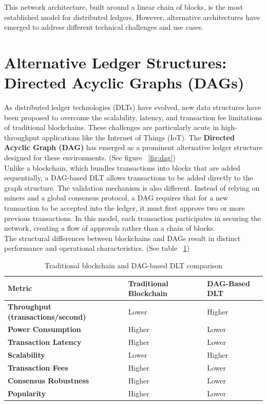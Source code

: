 \documentclass{scrbook}
\begin{document}
This network architecture, built around a linear chain of blocks, is the most established model for distributed ledgers. However, alternative architectures have emerged to address different technical challenges and use cases.\\

\section{Alternative Ledger Structures: Directed Acyclic Graphs (DAGs)}

As distributed ledger technologies (DLTs) have evolved, new data structures have been proposed to overcome the scalability, latency, and transaction fee limitations of traditional blockchains. These challenges are particularly acute in high-throughput applications like the Internet of Things (IoT). The \textbf{Directed Acyclic Graph (DAG)} has emerged as a prominent alternative ledger structure designed for these environments. (See figure ~\ref{fig:dag})\\

Unlike a blockchain, which bundles transactions into blocks that are added sequentially, a DAG-based DLT allows transactions to be added directly to the graph structure. The validation mechanism is also different. Instead of relying on miners and a global consensus protocol, a DAG requires that for a new transaction to be accepted into the ledger, it must first approve two or more previous transactions. In this model, each transaction participates in securing the network, creating a flow of approvals rather than a chain of blocks.\\

The structural differences between blockchains and DAGs result in distinct performance and operational characteristics. (See table ~\ref{tbl:BC_vs_DAG})\\

\begin{table}
    \centering
    \begin{tabularx}{\linewidth}{|X|X|X|}
        \hline
        Metric & Traditional Blockchain & DAG-Based DLT \\ \hline
        \textbf{Throughput (transactions/second)} & Lower & Higher \\ \hline
        \textbf{Power Consumption} & Higher & Lower \\ \hline
        \textbf{Transaction Latency} & Higher & Lower \\ \hline
        \textbf{Scalability} & Lower & Higher \\ \hline
        \textbf{Transaction Fees} & Higher & Lower \\ \hline
        \textbf{Consensus Robustness} & Higher & Lower \\ \hline
        \textbf{Popularity} & Higher & Lower \\ \hline
    \end{tabularx}
    \caption{Traditional blockchain and DAG-based DLT comparison}
    \label{tbl:BC_vs_DAG}
\end{table}
\end{document}
